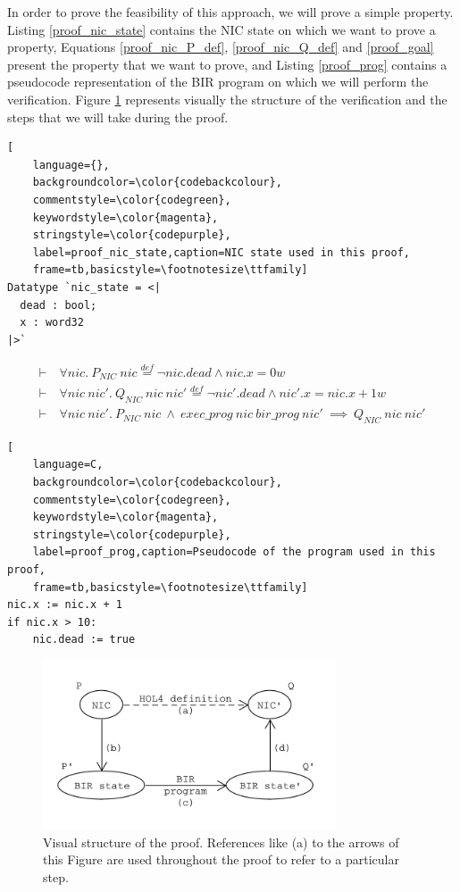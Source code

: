 \documentclass{kththesis}
\newcommand{\eqdef}{\stackrel{def}{=}}
\begin{document}
In order to prove the feasibility of this approach, we will prove a simple property. Listing \ref{proof_nic_state} contains the NIC state on which we want to prove a property, Equations \ref{proof_nic_P_def}, \ref{proof_nic_Q_def} and \ref{proof_goal} present the property that we want to prove, and Listing \ref{proof_prog} contains a pseudocode representation of the BIR program on which we will perform the verification. Figure \ref{proof_schema} represents visually the structure of the verification and the steps that we will take during the proof. 

\begin{lstlisting}[
    language={},
    backgroundcolor=\color{codebackcolour},
    commentstyle=\color{codegreen},
    keywordstyle=\color{magenta},
    stringstyle=\color{codepurple},
    label=proof_nic_state,caption=NIC state used in this proof,
    frame=tb,basicstyle=\footnotesize\ttfamily]
Datatype `nic_state = <|
  dead : bool;
  x : word32
|>`
\end{lstlisting}

\begin{small}
\begin{align}
\label{proof_nic_P_def}
\vdash~&\forall nic.~P_{NIC}~nic \eqdef \neg nic.dead \land nic.x = 0w\\
%
\label{proof_nic_Q_def}
\vdash~&\forall nic~nic'.~Q_{NIC}~nic~nic' \eqdef \neg nic'.dead \land nic'.x = nic.x + 1w\\
%
\label{proof_goal}
\vdash~&\forall nic~nic'.~P_{NIC}~nic~\land~exec\_prog~nic~bir\_prog~nic'~\implies~Q_{NIC}~nic~nic'
\end{align}
\end{small}

\begin{lstlisting}[
    language=C,
    backgroundcolor=\color{codebackcolour},
    commentstyle=\color{codegreen},
    keywordstyle=\color{magenta},
    stringstyle=\color{codepurple},
    label=proof_prog,caption=Pseudocode of the program used in this proof,
    frame=tb,basicstyle=\footnotesize\ttfamily]
nic.x := nic.x + 1
if nic.x > 10:
    nic.dead := true
\end{lstlisting}

\begin{figure}[!h]
	\includegraphics[height=5cm]{figures/proof_schema.png}
	\centering
	\caption{Visual structure of the proof. References like (a) to the arrows of this Figure are used throughout the proof to refer to a particular step.}
	\label{proof_schema}
\end{figure}
\end{document}
